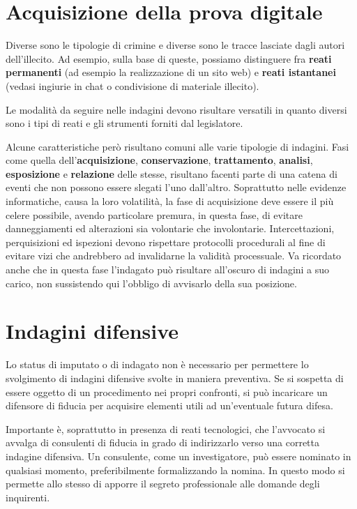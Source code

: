 \section{Acquisizione della prova digitale}

Diverse sono le tipologie di crimine e diverse sono le tracce lasciate dagli autori dell'illecito. Ad esempio, sulla base di queste, possiamo distinguere fra \textbf{reati permanenti} (ad esempio la realizzazione di un sito web) e \textbf{reati istantanei} (vedasi ingiurie in chat o condivisione di materiale illecito).

Le modalità da seguire nelle indagini devono risultare versatili in quanto diversi sono i tipi di reati e gli strumenti forniti dal legislatore.

Alcune caratteristiche però risultano comuni alle varie tipologie di indagini. Fasi come quella dell'\textbf{acquisizione}, \textbf{conservazione}, \textbf{trattamento}, \textbf{analisi}, \textbf{esposizione} e \textbf{relazione} delle stesse, risultano facenti parte di una catena di eventi che non possono essere slegati l'uno dall'altro. Soprattutto nelle evidenze informatiche, causa la loro volatilità, la fase di acquisizione deve essere il più celere possibile, avendo particolare premura, in questa fase, di evitare danneggiamenti ed alterazioni sia volontarie che involontarie. Intercettazioni, perquisizioni ed ispezioni devono rispettare protocolli procedurali al fine di evitare vizi che andrebbero ad invalidarne la validità processuale. Va ricordato anche che in questa fase l'indagato può risultare all'oscuro di indagini a suo carico, non sussistendo qui l'obbligo di avvisarlo della sua posizione.

\section{Indagini difensive}

Lo status di imputato o di indagato non è necessario per permettere lo svolgimento di indagini difensive svolte in maniera preventiva. Se si sospetta di essere oggetto di un procedimento nei propri confronti, si può incaricare un difensore di fiducia per acquisire elementi utili ad un'eventuale futura difesa.

Importante è, soprattutto in presenza di reati tecnologici, che l'avvocato si avvalga di consulenti di fiducia in grado di indirizzarlo verso una corretta indagine difensiva. Un consulente, come un investigatore, può essere nominato in qualsiasi momento, preferibilmente formalizzando la nomina. In questo modo si permette allo stesso di apporre il segreto professionale alle domande degli inquirenti.

